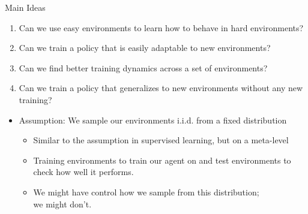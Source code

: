 \begin{frame}[c]{Main Ideas}
	
	\begin{enumerate}
		\item Can we use easy environments to learn how to behave in hard environments?
		\pause
		\item Can we train a policy that is easily adaptable to new environments?
		\pause
		\item Can we find better training dynamics across a set of environments?
		\pause
		\item Can we train a policy that generalizes to new environments without any new training?
	\end{enumerate}

	\begin{itemize}
		\item Assumption: We sample our environments i.i.d. from a fixed distribution
		\begin{itemize}
			\item Similar to the assumption in supervised learning, but on a meta-level
			\item Training environments to train our agent on and test environments to check how well it performs.
			\item We might have control how we sample from this distribution;\\ we might don't.
		\end{itemize}
	\end{itemize}
			
\end{frame}

